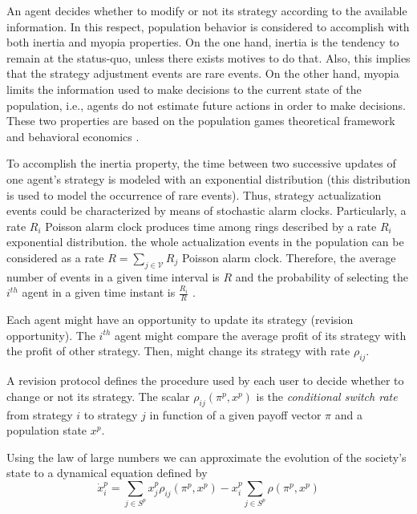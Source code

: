 \documentclass[a4paper,10pt]{article}
\def\th{^{th}}
\begin{document}
An agent decides whether to modify or not its strategy according to the available information. In this respect,  population behavior is considered to accomplish with both inertia and myopia properties. On the one hand, inertia 
is the tendency to remain at the status-quo, unless there exists motives to do that.
Also, this implies that the strategy adjustment events are rare events.
On the other hand, myopia limits the information used to make decisions to the current state of the population, i.e., agents do not estimate future actions in
order to make decisions. These two properties are based on the population games theoretical framework \cite{sandholm_book}
and behavioral economics \cite{gal}.

To accomplish the inertia property, the time between two successive updates of one 
agent's strategy is modeled with an exponential distribution (this distribution is used to model the occurrence of rare events). 
Thus, strategy actualization events could be characterized by means of stochastic alarm clocks.
Particularly, a rate $R_i$ Poisson alarm clock produces time among rings described by
a rate $R_i$ exponential distribution.
the whole actualization events in the population can be considered as a rate $R=\sum_{j\in \mathcal{V}} R_j$ Poisson alarm clock.
Therefore, the average number of events in a given time interval is $R$ and the probability of selecting the $i^{th}$
agent in a given time instant is
 $\frac{R_i}{R}$ \cite{sandholm_book}.

Each agent might have an opportunity to update its strategy (revision opportunity). The $i\th$ agent might compare the average profit of its strategy with the profit of other strategy. Then, might change its strategy with rate $\rho_{ij}$.
 
 A revision protocol defines the procedure used by each user to decide whether to change or not its strategy. The scalar $\rho_{ij} (\pi^p, x^p)$ is the \emph{conditional switch rate} from strategy $i$ to strategy $j$ in function of a given payoff vector $\pi$ and a population state $x^p$.
 
 Using the law of large numbers we can approximate the evolution of the society's state to a dynamical equation defined by
 \begin{equation}\label{eq:mean_dynamic}
  \dot{x}_i^p = \sum_{j\in S^p} x_j^p \rho_{ij} (\pi^p, x^p) - x_i^p \sum_{j\in S^p} \rho(\pi^p, x^p)
 \end{equation}
\end{document}
